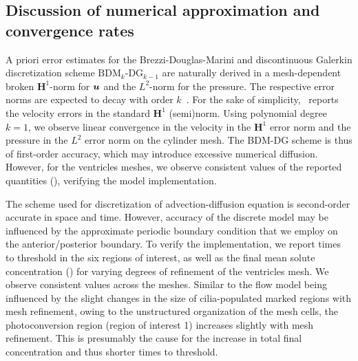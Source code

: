 \documentclass{WileyMSP-template}
\begin{document}
\subsection{Discussion of numerical approximation and convergence rates}
A priori error estimates for the
Brezzi-Douglas-Marini and discontinuous Galerkin discretization scheme
$\mathrm{BDM}_k$-$\mathrm{DG}_{k-1}$ are naturally 
derived in a mesh-dependent broken $\mathbf{H}^1$-norm for $\bm{u}$ and the $L^2$-norm for the pressure.
The respective error norms are expected to decay with order $k$~\cite{Cockburn2005AEquations}.
For the sake of simplicity,~
reports the velocity errors in the standard $\mathbf{H}^1$ (semi)norm. Using polynomial degree  
$k=1$, we observe linear convergence in the velocity in the $\mathbf{H}^1$ error norm
and the pressure in the $L^2$ error norm on the cylinder mesh. The BDM-DG scheme is
thus of first-order accuracy, which may introduce excessive numerical diffusion.
However, for the ventricles meshes, we observe consistent values of the reported quantities
(), verifying the model implementation.

The scheme used for discretization of advection-diffusion
equation is second-order accurate in space and time.
However, accuracy of the discrete model may be influenced by the
approximate periodic boundary condition
that we employ on the anterior/posterior boundary.
To verify the implementation, we report times to threshold in the six regions of interest,
as well as the final mean solute concentration ()
for varying degrees of refinement of the ventricles mesh.
We observe consistent values across the meshes.
Similar to the flow model being influenced by the slight changes
in the size of cilia-populated marked regions with mesh refinement,
owing to the unstructured organization of the mesh cells, the 
photoconversion region (region of interest 1) increases slightly
with mesh refinement. This is presumably the cause for
the increase in total final concentration and thus
shorter times to threshold.
\end{document}
